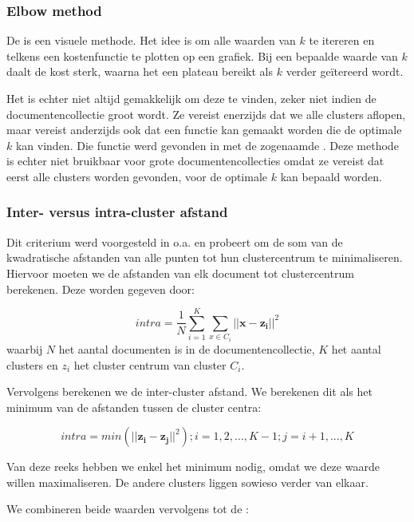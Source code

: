 \subsubsection{Elbow method}
De  \cite{Science2013} is een visuele methode. Het idee is om alle waarden van $k$ te itereren en telkens een kostenfunctie te plotten op een grafiek. Bij een bepaalde waarde van $k$ daalt de kost sterk, waarna het een plateau bereikt als $k$ verder ge\"itereerd wordt. 

Het is echter niet altijd gemakkelijk om deze  te vinden, zeker niet indien de documentencollectie groot wordt. Ze vereist enerzijds dat we alle clusters aflopen, maar vereist anderzijds ook dat een functie kan gemaakt worden die de optimale $k$ kan vinden. Die functie werd gevonden in \cite{Tibshirani2001} met de zogenaamde . Deze methode is echter niet bruikbaar voor grote documentencollecties omdat ze vereist dat eerst alle clusters worden gevonden, voor de optimale $k$ kan bepaald worden. 

\subsubsection{Inter- versus intra-cluster afstand}
Dit criterium werd voorgesteld in o.a. \cite{Ray} en probeert om de som van de kwadratische afstanden van alle punten tot hun clustercentrum te minimaliseren. Hiervoor moeten we de afstanden van elk document tot clustercentrum berekenen. Deze worden gegeven door:

\begin{equation}
intra = \frac{1}{N}\sum_{i=1}^{K}\sum_{x\in{C_i}}^{} \vert\vert \mathbf{x-z_i} \vert\vert ^2 
\end{equation}
waarbij $N$ het aantal documenten is in de documentencollectie, $K$ het aantal clusters en $z_i$ het cluster centrum van cluster $C_i$.

Vervolgens berekenen we de inter-cluster afstand. We berekenen dit als het minimum van de afstanden tussen de cluster centra:

\begin{equation}
intra = min(\vert\vert \mathbf{z_i-z_j}\vert\vert^2) ; i = 1,2,...,K-1 ; j = i+1, ..., K
\end{equation}

Van deze reeks hebben we enkel het minimum nodig, omdat we deze waarde willen maximaliseren. De andere clusters liggen sowieso verder van elkaar.

We combineren beide waarden vervolgens tot de :

